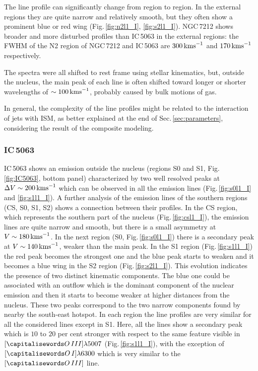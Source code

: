 \documentclass[../main.tex]{subfiles}
\begin{document}
The line profile can significantly change from region to region.
In the external regions they are quite narrow and relatively smooth, but they often show a prominent blue or red wing (Fig.\,\ref{fig:n2l1_I}, \ref{fig:s2l1_I}).
NGC\,7212 shows broader and more disturbed profiles than IC\,5063 in the external regions: the FWHM of the N2 region of NGC\,7212 and IC\,5063 are $300\,\si{\kms}$ and $170\,\si{\kms}$ respectively.

The spectra were all shifted to rest frame using stellar kinematics, but, outside the nucleus, the main peak of each line is often shifted toward longer or shorter wavelengths of $\sim100\,\si{\kms}$, probably caused by bulk motions of gas.

In general, the complexity of the line profiles might be related to the interaction of jets with ISM, as better explained at the end of Sec.\,\ref{sec:parameters}, considering the result of the composite modeling.


\subsubsection{IC\,5063}
IC\,5063 shows an emission outside the nucleus (regions S0 and S1, Fig.\,\ref{fig:IC5063}, bottom panel) characterized by two well resolved peaks at $\Delta V\sim 200\,\si{\kms}$ which can be observed in all the emission lines (Fig.\,\ref{fig:s0l1_I} and \ref{fig:s1l1_I}).
A further analysis of the emission lines of the southern regions (CS, S0, S1, S2) shows a connection between their profiles.
In the CS region, which represents the southern part of the nucleus (Fig.\,\ref{fig:csl1_I}), the emission lines are quite narrow and smooth, but there is a small asymmetry at $V\sim 180\,\si{\kms}$.
In the next region (S0, Fig.\,\ref{fig:s0l1_I}) there is a secondary peak at $V\sim 140\,\si{\kms}$, weaker than the main peak.  
In the S1 region (Fig.\,\ref{fig:s1l1_I}) the red peak becomes the strongest one and the blue peak starts to weaken and it becomes a blue wing in the S2 region (Fig.\,\ref{fig:s2l1_I}).
This evolution indicates the presence of two distinct kinematic components.
The blue one could be associated with an outflow which is the dominant component of the nuclear emission and then it starts to become weaker at higher distances from the nucleus.
These two peaks correspond to the two narrow components found by \citet{Morganti07} nearby the south-east hotspot.
In each region the line profiles are very similar for all the considered lines except in S1.
Here, all the lines show a secondary peak which is $10$ to $20$ per cent stronger with respect to the same feature visible in $[\ion{O}{III}]\lambda5007$  (Fig.\,\ref{fig:s1l1_I}), with the exception of $[\ion{O}{I}]\lambda6300$ which is very similar to the $[\ion{O}{III}]$ line.
\end{document}
